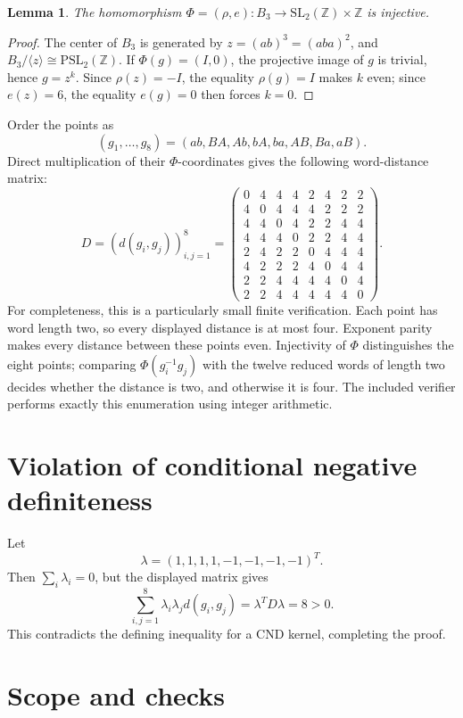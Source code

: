 \documentclass[10pt]{article}
\newtheorem{lemma}{Lemma}
\newcommand{\B}{B_3}
\begin{document}
\begin{lemma}
The homomorphism \(\Phi=(\rho,e):\B\to
\mathrm{SL}_2(\mathbb Z)\times\mathbb Z\) is injective.
\end{lemma}

\begin{proof}
The center of \(\B\) is generated by
\(z=(ab)^3=(aba)^2\), and \(\B/\langle z\rangle\cong
\mathrm{PSL}_2(\mathbb Z)\).  If \(\Phi(g)=(I,0)\), the projective image
of \(g\) is trivial, hence \(g=z^k\).  Since \(\rho(z)=-I\), the equality
\(\rho(g)=I\) makes \(k\) even; since \(e(z)=6\), the equality \(e(g)=0\)
then forces \(k=0\).
\end{proof}

Order the points as
\[
 (g_1,\ldots,g_8)=(ab,BA,Ab,bA,ba,AB,Ba,aB).
\]
Direct multiplication of their \(\Phi\)-coordinates gives the following
word-distance matrix:
\[
D=(d(g_i,g_j))_{i,j=1}^8=
\begin{pmatrix}
0&4&4&4&2&4&2&2\\
4&0&4&4&4&2&2&2\\
4&4&0&4&2&2&4&4\\
4&4&4&0&2&2&4&4\\
2&4&2&2&0&4&4&4\\
4&2&2&2&4&0&4&4\\
2&2&4&4&4&4&0&4\\
2&2&4&4&4&4&4&0
\end{pmatrix}.
\]
For completeness, this is a particularly small finite verification.  Each
point has word length two, so every displayed distance is at most four.
Exponent parity makes every distance between these points even.  Injectivity
of \(\Phi\) distinguishes the eight points; comparing
\(\Phi(g_i^{-1}g_j)\) with the twelve reduced words of length two decides
whether the distance is two, and otherwise it is four.  The included verifier
performs exactly this enumeration using integer arithmetic.

\section*{Violation of conditional negative definiteness}

Let
\[
 \lambda=(1,1,1,1,-1,-1,-1,-1)^T.
\]
Then \(\sum_i\lambda_i=0\), but the displayed matrix gives
\[
 \sum_{i,j=1}^8 \lambda_i\lambda_j d(g_i,g_j)
 =\lambda^TD\lambda=8>0.
\]
This contradicts the defining inequality for a CND kernel, completing the
proof.

\section*{Scope and checks}
\end{document}
